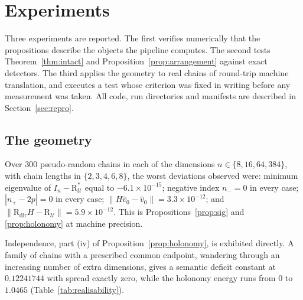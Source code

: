 \documentclass[11pt,a4paper]{article}
\theoremstyle{plain}
\theoremstyle{definition}
\numberwithin{equation}{section}
\newcommand{\Uc}{\mathcal{U}}
\begin{document}
\section{Experiments}\label{sec:experiments}

Three experiments are reported. The first verifies numerically that the
propositions describe the objects the pipeline computes. The second
tests Theorem~\ref{thm:intact} and Proposition~\ref{prop:arrangement}
against exact detectors. The third applies the geometry to real chains
of round-trip machine translation, and executes a test whose criterion
was fixed in writing before any measurement was taken. All code, run
directories and manifests are described in Section~\ref{sec:repro}.

\subsection{The geometry}

Over $300$ pseudo-random chains in each of the dimensions
$n \in \{8,16,64,384\}$, with chain lengths in $\{2,3,4,6,8\}$, the
worst deviations observed were: minimum eigenvalue of
$I_n - \mathrm{R}^{*}_\Uc$ equal to $-6.1\times10^{-15}$; negative index
$n_- = 0$ in every case; $|n_+ - 2p| = 0$ in every case;
$\|H\hat{v}_0-\hat{v}_0\| = 3.3\times10^{-12}$; and
$\|\mathrm{R}_{\mathrm{dir}}H - \mathrm{R}_\Uc\| = 5.9\times10^{-12}$. This is
Propositions~\ref{prop:sig} and \ref{prop:holonomy} at machine
precision.

Independence, part (iv) of Proposition~\ref{prop:holonomy}, is
exhibited directly. A family of chains with a prescribed common
endpoint, wandering through an increasing number of extra dimensions,
gives a semantic deficit constant at $0.12241744$ with spread exactly
zero, while the holonomy energy runs from $0$ to $1.0465$
(Table~\ref{tab:realisability}).
\end{document}
